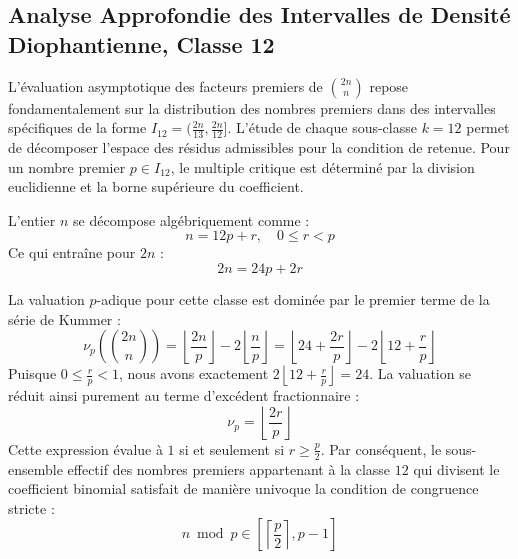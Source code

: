\documentclass[12pt,a4paper]{article}
\begin{document}
    \newpage
    \subsection{Analyse Approfondie des Intervalles de Densité Diophantienne, Classe 12}
    L'évaluation asymptotique des facteurs premiers de $\binom{2n}{n}$ repose fondamentalement sur la distribution des nombres premiers dans des intervalles spécifiques de la forme $I_12 = (\frac{2n}{13}, \frac{2n}{12}]$.
    L'étude de chaque sous-classe $k = 12$ permet de décomposer l'espace des résidus admissibles pour la condition de retenue.
    Pour un nombre premier $p \in I_12$, le multiple critique est déterminé par la division euclidienne et la borne supérieure du coefficient.

    L'entier $n$ se décompose algébriquement comme :
    \begin{equation}
    n = 12 p + r, \quad 0 \le r < p
    \end{equation}
    Ce qui entraîne pour $2n$ :
    \begin{equation}
    2n = 24 p + 2r
    \end{equation}

    La valuation $p$-adique pour cette classe est dominée par le premier terme de la série de Kummer :
    \begin{equation}
    \nu_p\left( \binom{2n}{n} \right) = \left\lfloor \frac{2n}{p} \right\rfloor - 2 \left\lfloor \frac{n}{p} \right\rfloor = \left\lfloor 24 + \frac{2r}{p} \right\rfloor - 2 \left\lfloor 12 + \frac{r}{p} \right\rfloor
    \end{equation}
    Puisque $0 \le \frac{r}{p} < 1$, nous avons exactement $2 \left\lfloor 12 + \frac{r}{p} \right\rfloor = 24$.
    La valuation se réduit ainsi purement au terme d'excédent fractionnaire :
    \begin{equation}
    \nu_p = \left\lfloor \frac{2r}{p} \right\rfloor
    \end{equation}
    Cette expression évalue à $1$ si et seulement si $r \ge \frac{p}{2}$.
    Par conséquent, le sous-ensemble effectif des nombres premiers appartenant à la classe $12$ qui divisent le coefficient binomial satisfait de manière univoque la condition de congruence stricte :
    \begin{equation}
    n \bmod p \in \left[ \left\lceil \frac{p}{2} \right\rceil, p - 1 \right]
    \end{equation}
\end{document}
